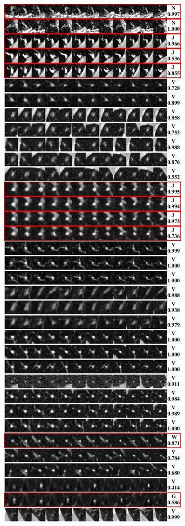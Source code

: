 \documentclass[onecolumn]{IEEEtran}
\begin{document}
\begin{figure}[H]
{\includegraphics[width=0.45\columnwidth]{./images/elcap-msnodules-vessel1}
}
\end{figure}
\newpage
\end{document}
